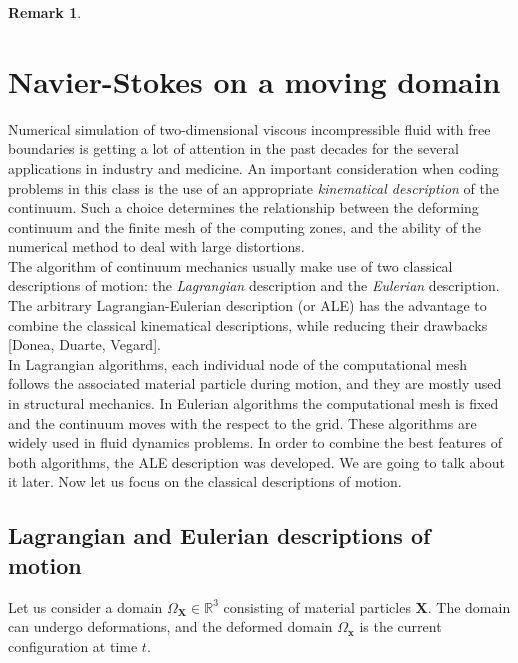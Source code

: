 \documentclass[a4paper,11pt,openright,twoside]{book}
\newtheorem*{remark}{Remark}
\begin{document}
\begin{remark}
\end{remark}


\section{Navier-Stokes on a moving domain}

Numerical simulation of two-dimensional viscous incompressible fluid with free boundaries is getting a lot of attention in the past decades for the several applications in industry and medicine. An important consideration when coding problems in this class is the use of an appropriate \emph{kinematical description} of the continuum. Such a choice determines the relationship between the deforming continuum and the finite mesh of the computing zones, and the ability of the numerical method to deal with large distortions. \\
The algorithm of continuum mechanics usually make use of two classical descriptions of motion: the \emph{Lagrangian} description and the \emph{Eulerian} description. The arbitrary Lagrangian-Eulerian description (or ALE) has the advantage to combine the classical kinematical descriptions, while reducing their drawbacks [Donea, Duarte, Vegard]. \\
In Lagrangian algorithms, each individual node of the computational mesh follows the associated material particle during motion, and they are mostly used in structural mechanics.
In Eulerian algorithms the computational mesh is fixed and the continuum moves with the respect to the grid. These algorithms are widely used in fluid dynamics problems.
In order to combine the best features of both algorithms, the ALE description was developed. We are going to talk about it later. Now let us focus on the classical descriptions of motion.


\subsection{Lagrangian and Eulerian descriptions of motion}
Let us consider a domain $\Omega_{\mathbf{X}} \in \mathbb{R}^3$ consisting of material particles $\mathbf{X}$. The domain can undergo deformations, and the deformed domain $\Omega_\mathbf{x}$ is the current configuration at time $t$.
\end{document}

